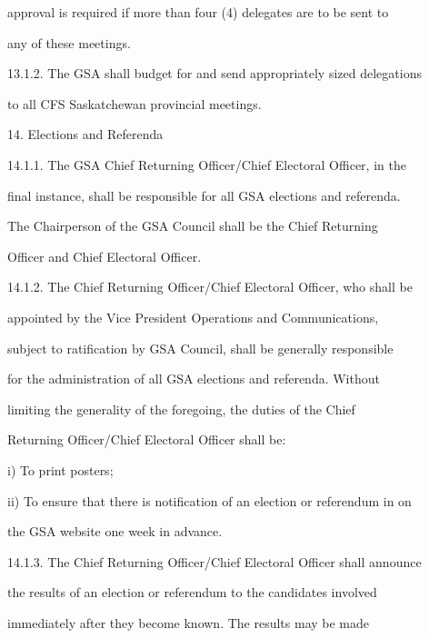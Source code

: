        approval is required if more than four (4) delegates are to be sent to  

        any of these meetings.  



13.1.2.     The GSA shall budget  for and send appropriately sized delegations  

        to all CFS Saskatchewan provincial meetings.  



14.  Elections and Referenda  



14.1.1.     The  GSA  Chief  Returning  Officer/Chief  Electoral  Officer,  in  the  

        final instance, shall be responsible for all GSA elections and referenda.  

        The  Chairperson  of  the  GSA  Council  shall  be  the  Chief  Returning  

        Officer and Chief Electoral Officer.  



14.1.2.     The Chief Returning Officer/Chief Electoral Officer, who shall be  

        appointed  by  the  Vice  President  Operations  and  Communications,  

        subject to ratification by GSA Council, shall be generally responsible  

        for  the  administration  of  all  GSA  elections  and  referenda.  Without  

        limiting  the  generality  of  the  foregoing,  the  duties  of  the  Chief  

        Returning Officer/Chief Electoral Officer shall be:  



i)      To print posters;  



ii)     To ensure that there is notification of an election or referendum in on  

        the GSA website one week in advance.  



14.1.3.     The Chief Returning Officer/Chief Electoral Officer shall announce  

        the  results  of  an  election  or  referendum  to  the  candidates  involved  

        immediately  after  they  become  known.  The  results  may  be  made  



